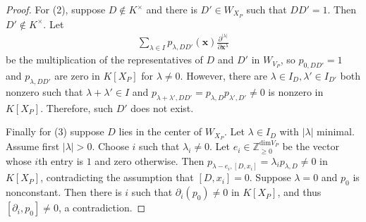 \documentclass[10pt,a4paper]{amsart}
\newcommand{\zz}{\mathbb Z}
\begin{document}
\begin{proof}
For (2), suppose $D\not\in K^\times$ and there is $D'\in W_{X_P}$ such that $DD'=1$. Then $D'\not\in K^\times.$ Let
\begin{align*}
    \sum_{\lambda\in I} p_{\lambda,DD'}(\mathbf{x})\frac{\partial^{|\lambda|}}{\partial \mathbf{x}^\lambda}
\end{align*}
be the multiplication of the representatives of $D$ and $D'$ in $W_{V_P}$, so $p_{0,DD'}=1$ and  $p_{\lambda,DD'}$ are zero in $K[X_P]$ for $\lambda\neq 0$. However, there are $\lambda\in I_D,\lambda'\in I_{D'}$ both nonzero such that $\lambda+\lambda'\in I$ and   $p_{\lambda+\lambda',DD'}=p_{\lambda,D}p_{\lambda',D'}\neq 0$
is nonzero in $K[X_P]$. Therefore, such $D'$ does not exist. 

Finally for (3) suppose $D$ lies in the center of $W_{X_P}$. Let $\lambda\in I_D$ with $|\lambda|$ minimal. Assume first $|\lambda|>0$. Choose $i$ such that $\lambda_i\neq 0$. Let $e_i\in \zz_{\ge 0}^{\mathrm{dim}V_P}$ be the vector whose $i$th entry is $1$ and zero otherwise. Then $p_{\lambda-e_i,[D,x_i]}=\lambda_i p_{\lambda,D}\neq 0$
in $K[X_P]$, contradicting the assumption that $[D,x_i]=0$. Suppose $\lambda=0$ and $p_0$ is nonconstant. Then there is $i$ such that $\partial_i(p_0)\neq 0$ in $K[X_P]$, and thus $[\partial_i,p_0]\neq 0$, a contradiction.
\end{proof}
\end{document}
